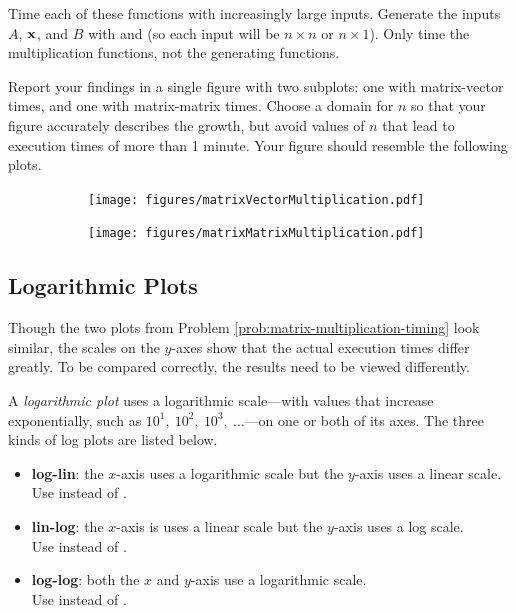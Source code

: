 \begin{problem}
Time each of these functions with increasingly large inputs.
Generate the inputs $A$, $\mathbf{x}$, and $B$ with  and  (so each input will be $n \times n$ or $n \times 1$).
Only time the multiplication functions, not the generating functions.

Report your findings in a single figure with two subplots: one with matrix-vector times, and one with matrix-matrix times.
Choose a domain for $n$ so that your figure accurately describes the growth, but avoid values of $n$ that lead to execution times of more than 1 minute.
Your figure should resemble the following plots.

\begin{figure}[H] %
\captionsetup[subfigure]{justification=centering}
\centering
\begin{subfigure}{.5\textwidth}
    \centering
    \texttt{[image: figures/matrixVectorMultiplication.pdf]}
\end{subfigure}%
\begin{subfigure}{.482\textwidth}
    \centering
    \texttt{[image: figures/matrixMatrixMultiplication.pdf]}
\end{subfigure}
\end{figure}

\label{prob:matrix-multiplication-timing}
\end{problem}

\subsection*{Logarithmic Plots} %

Though the two plots from Problem \ref{prob:matrix-multiplication-timing} look similar, the scales on the $y$-axes show that the actual execution times differ greatly.
To be compared correctly, the results need to be viewed differently.

A \emph{logarithmic plot} uses a logarithmic scale---with values that increase exponentially, such as $10^1,\ 10^2,\ 10^3,\ \ldots$---on one or both of its axes.
The three kinds of log plots are listed below.

\begin{itemize}
\item \textbf{log-lin}: the $x$-axis uses a logarithmic scale but the $y$-axis uses a linear scale.\\
Use  instead of .
\item \textbf{lin-log}: the $x$-axis is uses a linear scale but the $y$-axis uses a log scale.\\
Use  instead of .
\item \textbf{log-log}: both the $x$ and $y$-axis use a logarithmic scale.\\
Use  instead of .
\end{itemize}

